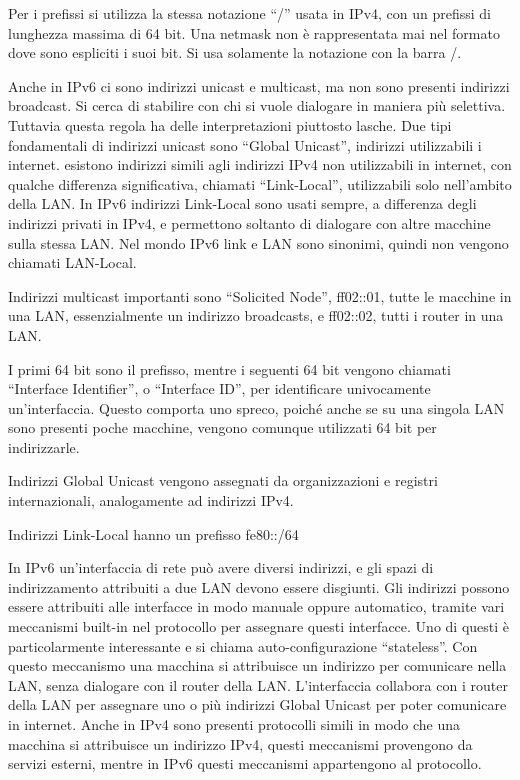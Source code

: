 \documentclass{article}
\numberwithin{equation}{subsection}
\begin{document}
Per i prefissi si utilizza la stessa notazione ``/'' usata in IPv4, con un prefissi di lunghezza massima di 64 bit. Una netmask non è rappresentata mai nel formato dove 
sono espliciti i suoi bit. Si usa solamente la notazione con la barra /. 

Anche in IPv6 ci sono indirizzi unicast e multicast, ma non sono presenti indirizzi broadcast. Si cerca di stabilire con chi si vuole dialogare in maniera più selettiva. 
Tuttavia questa regola ha delle interpretazioni piuttosto lasche. 
Due tipi fondamentali di indirizzi unicast sono ``Global Unicast'', indirizzi utilizzabili i internet. esistono indirizzi simili agli indirizzi IPv4 non utilizzabili 
in internet, con qualche differenza significativa, chiamati ``Link-Local'', utilizzabili solo nell'ambito della LAN. 
In IPv6 indirizzi Link-Local sono usati sempre, a differenza degli indirizzi privati in IPv4, e permettono soltanto di dialogare con altre macchine sulla stessa LAN. 
Nel mondo IPv6 link e LAN sono sinonimi, quindi non vengono chiamati LAN-Local. 

Indirizzi multicast importanti sono ``Solicited Node'', ff02::01, tutte le macchine in una LAN, essenzialmente un indirizzo broadcasts, e ff02::02, tutti i router in 
una LAN. 

I primi 64 bit sono il prefisso, mentre i seguenti 64 bit vengono chiamati ``Interface Identifier'', o ``Interface ID'', per identificare univocamente un'interfaccia. 
Questo comporta uno spreco, poiché anche se su una singola LAN sono presenti poche macchine, vengono comunque utilizzati 64 bit per indirizzarle. 

Indirizzi Global Unicast vengono assegnati da organizzazioni e registri internazionali, analogamente ad indirizzi IPv4. 

Indirizzi Link-Local hanno un prefisso fe80::/64


In IPv6 un'interfaccia di rete può avere diversi indirizzi, e gli spazi di indirizzamento attribuiti a due LAN devono essere disgiunti. Gli indirizzi possono 
essere attribuiti alle interfacce in modo manuale oppure automatico, tramite vari meccanismi built-in nel protocollo per assegnare questi interfacce. Uno di questi 
è particolarmente interessante e si chiama auto-configurazione ``stateless''. 
Con questo meccanismo una macchina si attribuisce un indirizzo per comunicare nella LAN, senza dialogare con il router della LAN. L'interfaccia collabora con i 
router della LAN per assegnare uno o più indirizzi Global Unicast per poter comunicare in internet. 
Anche in IPv4 sono presenti protocolli simili in modo che una macchina si attribuisce un indirizzo IPv4, questi meccanismi provengono da servizi esterni, mentre in IPv6 
questi meccanismi appartengono al protocollo. 
\end{document}
